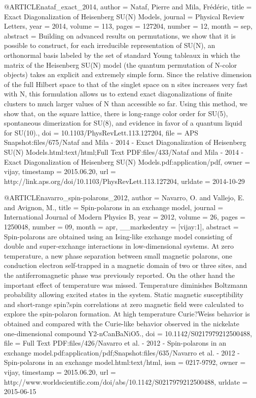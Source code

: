@ARTICLE{nataf_exact_2014,
  author = {Nataf, Pierre and Mila, Frédéric},
  title = {Exact {Diagonalization} of {Heisenberg} {SU}({N}) {Models}},
  journal = {Physical Review Letters},
  year = {2014},
  volume = {113},
  pages = {127204},
  number = {12},
  month = sep,
  abstract = {Building on advanced results on permutations, we show that it is possible
	to construct, for each irreducible representation of SU(N), an orthonormal
	basis labeled by the set of standard Young tableaux in which the
	matrix of the Heisenberg SU(N) model (the quantum permutation of
	N-color objects) takes an explicit and extremely simple form. Since
	the relative dimension of the full Hilbert space to that of the singlet
	space on n sites increases very fast with N, this formulation allows
	us to extend exact diagonalizations of finite clusters to much larger
	values of N than accessible so far. Using this method, we show that,
	on the square lattice, there is long-range color order for SU(5),
	spontaneous dimerization for SU(8), and evidence in favor of a quantum
	liquid for SU(10).},
  doi = {10.1103/PhysRevLett.113.127204},
  file = {APS Snapshot:files/675/Nataf and Mila - 2014 - Exact Diagonalization of Heisenberg SU(N) Models.html:text/html;Full Text PDF:files/433/Nataf and Mila - 2014 - Exact Diagonalization of Heisenberg SU(N) Models.pdf:application/pdf},
  owner = {vijay},
  timestamp = {2015.06.20},
  url = {http://link.aps.org/doi/10.1103/PhysRevLett.113.127204},
  urldate = {2014-10-29}
}

@ARTICLE{navarro_spin-polarons_2012,
  author = {Navarro, O. and Vallejo, E. and Avignon, M.},
  title = {Spin-polarons in an exchange model},
  journal = {International Journal of Modern Physics B},
  year = {2012},
  volume = {26},
  pages = {1250048},
  number = {09},
  month = apr,
  __markedentry = {[vijay:1]},
  abstract = {Spin-polarons are obtained using an Ising-like exchange model consisting
	of double and super-exchange interactions in low-dimensional systems.
	At zero temperature, a new phase separation between small magnetic
	polarons, one conduction electron self-trapped in a magnetic domain
	of two or three sites, and the antiferromagnetic phase was previously
	reported. On the other hand the important effect of temperature was
	missed. Temperature diminishes Boltzmann probability allowing excited
	states in the system. Static magnetic susceptibility and short-range
	spin?spin correlations at zero magnetic field were calculated to
	explore the spin-polaron formation. At high temperature Curie?Weiss
	behavior is obtained and compared with the Curie-like behavior observed
	in the nickelate one-dimensional compound Y2-nCanBaNiO5.},
  doi = {10.1142/S0217979212500488},
  file = {Full Text PDF:files/426/Navarro et al. - 2012 - Spin-polarons in an exchange model.pdf:application/pdf;Snapshot:files/635/Navarro et al. - 2012 - Spin-polarons in an exchange model.html:text/html},
  issn = {0217-9792},
  owner = {vijay},
  timestamp = {2015.06.20},
  url = {http://www.worldscientific.com/doi/abs/10.1142/S0217979212500488},
  urldate = {2015-06-15}
}

